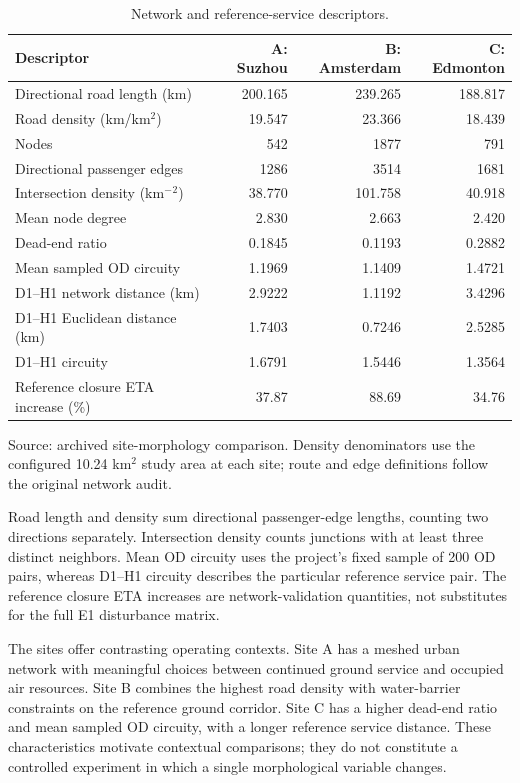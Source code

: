 \documentclass[]{interact}
\theoremstyle{plain}
\theoremstyle{definition}
\theoremstyle{remark}
\begin{document}
\begin{table}[!htbp]
\centering
\small
\setlength{\tabcolsep}{3pt}
\caption{Network and reference-service descriptors.}
\label{tab:table3}
\begin{tabularx}{\textwidth}{@{}Yrrr@{}}
\toprule
Descriptor & A: Suzhou & B: Amsterdam & C: Edmonton \\
\midrule
Directional road length (km) & 200.165 & 239.265 & 188.817 \\
Road density (km/km$^2$) & 19.547 & 23.366 & 18.439 \\
Nodes & 542 & 1877 & 791 \\
Directional passenger edges & 1286 & 3514 & 1681 \\
Intersection density (km$^-$$^2$) & 38.770 & 101.758 & 40.918 \\
Mean node degree & 2.830 & 2.663 & 2.420 \\
Dead-end ratio & 0.1845 & 0.1193 & 0.2882 \\
Mean sampled OD circuity & 1.1969 & 1.1409 & 1.4721 \\
D1--H1 network distance (km) & 2.9222 & 1.1192 & 3.4296 \\
D1--H1 Euclidean distance (km) & 1.7403 & 0.7246 & 2.5285 \\
D1--H1 circuity & 1.6791 & 1.5446 & 1.3564 \\
Reference closure ETA increase (\%) & 37.87 & 88.69 & 34.76 \\
\bottomrule
\end{tabularx}
\end{table}

Source: archived site-morphology comparison. Density denominators use the configured 10.24 km$^2$ study area at each site; route and edge definitions follow the original network audit.

Road length and density sum directional passenger-edge lengths, counting two directions separately. Intersection density counts junctions with at least three distinct neighbors. Mean OD circuity uses the project's fixed sample of 200 OD pairs, whereas D1--H1 circuity describes the particular reference service pair. The reference closure ETA increases are network-validation quantities, not substitutes for the full E1 disturbance matrix.

The sites offer contrasting operating contexts. Site A has a meshed urban network with meaningful choices between continued ground service and occupied air resources. Site B combines the highest road density with water-barrier constraints on the reference ground corridor. Site C has a higher dead-end ratio and mean sampled OD circuity, with a longer reference service distance. These characteristics motivate contextual comparisons; they do not constitute a controlled experiment in which a single morphological variable changes.
\end{document}
